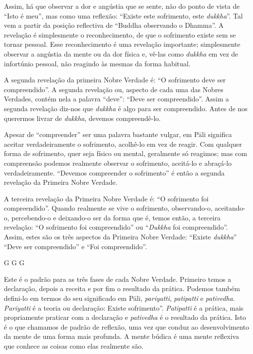Assim, há que observar a dor e angústia que se sente, não do ponto de vista de
“Isto é meu”, mas como uma reflexão: “Existe este sofrimento, este
\emph{dukkha}”. Tal vem a partir da posição reflectiva de “Buddha observando o
Dhamma”. A revelação é simplesmente o reconhecimento, de que o sofrimento existe
sem se tornar pessoal. Esse reconhecimento é uma revelação importante;
simplesmente observar a angústia da mente ou da dor física e, vê-las como
\emph{dukkha} em vez de infortúnio pessoal, não reagindo às mesmas da forma
habitual.

A segunda revelação da primeira Nobre Verdade é: “O sofrimento deve ser
compreendido”. A segunda revelação ou, aspecto de cada uma das Nobres Verdades,
contém nela a palavra “deve”: “Deve ser compreendido”. Assim a segunda revelação
diz-nos que \emph{dukkha} é algo para ser compreendido. Antes de nos querermos livrar
de \emph{dukkha}, devemos compreendê-lo.

Apesar de “compreender” ser uma palavra bastante vulgar, em Pāli significa
aceitar verdadeiramente o sofrimento, acolhê-lo em vez de reagir. Com qualquer
forma de sofrimento, quer seja físico ou mental, geralmente só reagimos; mas com
compreensão podemos realmente observar o sofrimento, aceitá-lo e abraçá-lo
verdadeiramente. “Devemos compreender o sofrimento” é então a segunda revelação
da Primeira Nobre Verdade.

A terceira revelação da Primeira Nobre Verdade é: “O sofrimento foi
compreendido”. Quando realmente se vive o sofrimento, observando-o, aceitando-o,
percebendo-o e deixando-o ser da forma que é, temos então, a terceira revelação:
“O sofrimento foi compreendido” ou “\emph{Dukkha} foi compreendido”. Assim,
estes são os três aspectos da Primeira Nobre Verdade: “Existe \emph{dukkha}”
“Deve ser compreendido” e “Foi compreendido”.

G G G

Este é o padrão para as três fases de cada Nobre Verdade. Primeiro temos a
declaração, depois a receita e por fim o resultado da prática. Podemos também
defini-lo em termos do seu significado em Pāli, \emph{pariyatti},
\emph{patipatti} e \emph{pativedha}. \emph{Pariyatti} é a teoria ou declaração:
Existe sofrimento”. \emph{Patipatti} é a prática, mais propriamente praticar com
a declaração e \emph{pativedha} é o resultado da prática. Isto é o que chamamos
de padrão de reflexão, uma vez que conduz ao desenvolvimento da mente de uma
forma mais profunda. A mente búdica é uma mente reflexiva que conhece as coisas
como elas realmente são.

